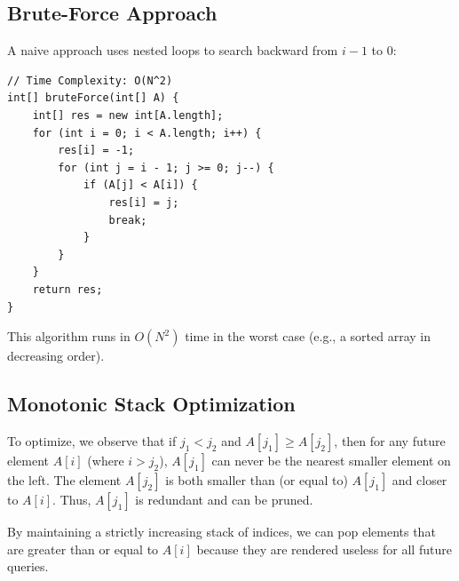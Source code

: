 \documentclass[10pt,journal,compsoc,onecolumn]{IEEEtran}
\begin{document}
\subsection{Brute-Force Approach}
A naive approach uses nested loops to search backward from $i-1$ to $0$:
\begin{verbatim}
// Time Complexity: O(N^2)
int[] bruteForce(int[] A) {
    int[] res = new int[A.length];
    for (int i = 0; i < A.length; i++) {
        res[i] = -1;
        for (int j = i - 1; j >= 0; j--) {
            if (A[j] < A[i]) {
                res[i] = j;
                break;
            }
        }
    }
    return res;
}
\end{verbatim}
This algorithm runs in $O(N^2)$ time in the worst case (e.g., a sorted array in decreasing order).

\subsection{Monotonic Stack Optimization}
To optimize, we observe that if $j_1 < j_2$ and $A[j_1] \ge A[j_2]$, then for any future element $A[i]$ (where $i > j_2$), $A[j_1]$ can never be the nearest smaller element on the left. The element $A[j_2]$ is both smaller than (or equal to) $A[j_1]$ and closer to $A[i]$. Thus, $A[j_1]$ is redundant and can be pruned.

By maintaining a strictly increasing stack of indices, we can pop elements that are greater than or equal to $A[i]$ because they are rendered useless for all future queries.
\end{document}
